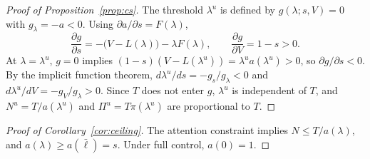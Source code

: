 \documentclass[11pt,a4paper]{article}
\theoremstyle{plain}
\newcommand{\lbar}{\bar{\ell}}
\begin{document}
\begin{proof}[Proof of Proposition~\ref{prop:cs}]
The threshold $\lambda^u$ is defined by $g(\lambda; s, V) = 0$ with $g_\lambda = -a < 0$. Using $\partial a/\partial s = F(\lambda)$,
\[
  \frac{\partial g}{\partial s} = -\big(V - L(\lambda)\big) - \lambda F(\lambda), \qquad \frac{\partial g}{\partial V} = 1 - s > 0.
\]
At $\lambda = \lambda^u$, $g = 0$ implies $(1-s)(V - L(\lambda^u)) = \lambda^u a(\lambda^u) > 0$, so $\partial g / \partial s < 0$. By the implicit function theorem, $d\lambda^u/ds = -g_s/g_\lambda < 0$ and $d\lambda^u/dV = -g_V/g_\lambda > 0$. Since $T$ does not enter $g$, $\lambda^u$ is independent of $T$, and $N^u = T/a(\lambda^u)$ and $\Pi^u = T\pi(\lambda^u)$ are proportional to $T$.
\end{proof}

\begin{proof}[Proof of Corollary~\ref{cor:ceiling}]
The attention constraint implies $N \le T/a(\lambda)$, and $a(\lambda) \ge a(\lbar) = s$. Under full control, $a(0) = 1$.
\end{proof}
\end{document}
